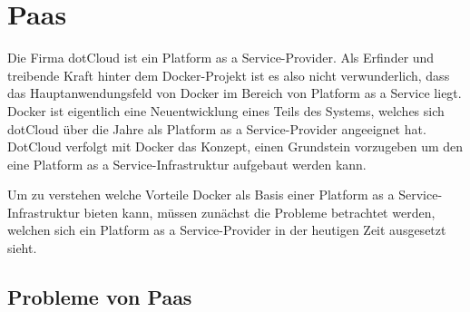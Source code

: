 \section{Paas}
\label{sec:paas}
Die Firma dotCloud ist ein Platform as a Service-Provider. Als Erfinder und treibende Kraft hinter dem Docker-Projekt ist es also nicht verwunderlich, dass das Hauptanwendungsfeld von Docker im Bereich von Platform as a Service liegt.
Docker ist eigentlich eine Neuentwicklung eines Teils des Systems, welches sich dotCloud über die Jahre als 
Platform as a Service-Provider angeeignet hat. DotCloud verfolgt mit Docker das Konzept, einen Grundstein vorzugeben um den eine Platform as a Service-Infrastruktur aufgebaut werden kann.\cite[Zeit 18:24]{hykes_introduction_2013}

Um zu verstehen welche Vorteile Docker als Basis einer Platform as a Service-Infrastruktur bieten kann, müssen zunächst die Probleme betrachtet werden, welchen sich ein Platform as a Service-Provider in der heutigen Zeit ausgesetzt sieht.

\subsection{Probleme von Paas}
\label{sec:probleme_von_paas}

